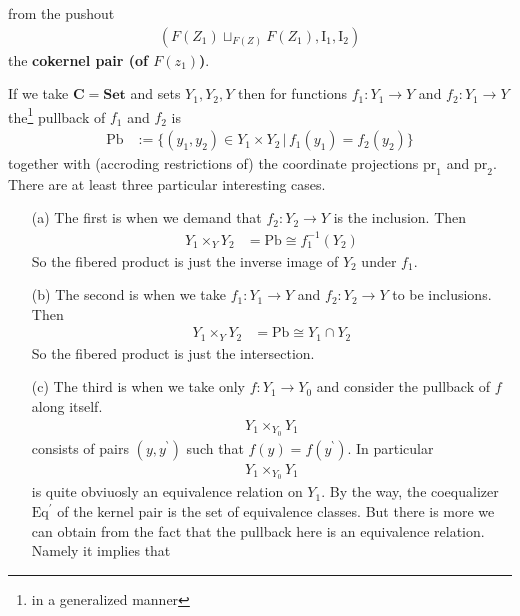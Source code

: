 \begin{exa}
\begin{enumerate}
\begin{enumerate}
from the pushout
\begin{align*}
  \left(
    F(Z_{1})
    \sqcup_{F(Z)}
    F(Z_{1}),
    \mathrm{I}_{1},
    \mathrm{I}_{2}
  \right)
\end{align*}
the \textbf{cokernel pair (of $F(z_{1})$)}.
\end{enumerate}
If we take $\mathbf{C} = \mathbf{Set}$ and sets $Y_{1},Y_{2},Y$ then for functions $f_{1} \colon Y_{1} \rightarrow Y$ and $f_{2} \colon Y_{1} \rightarrow Y$ the\footnote{in a generalized manner} pullback of $f_{1}$ and $f_{2}$ is
\begin{align*}
  \mathrm{Pb}
  &:=
  \lbrace
      (y_{1},y_{2})
      \in
      Y_{1}
      \times
      Y_{2}
    \,
    \vert
    \,
      f_{1}(y_{1})
      =
      f_{2}(y_{2})
  \rbrace
\end{align*}
together with (accroding restrictions of) the coordinate projections $\mathrm{pr}_{1}$ and $\mathrm{pr}_{2}$. There are at least three particular interesting cases.
\begin{enumerate}
\item[(a)]
The first is when we demand that $f_{2} \colon Y_{2} \rightarrow Y$ is the inclusion. Then
\begin{align*}
  Y_{1}
  \times_{Y}
  Y_{2}
  &=
  \mathrm{Pb}
  \cong
  f_{1}^{-1}(Y_{2})
\end{align*}
So the fibered product is just the inverse image of $Y_{2}$ under $f_{1}$.
\item[(b)]
The second is when we take $f_{1} \colon Y_{1} \rightarrow Y$ and $f_{2} \colon Y_{2} \rightarrow Y$ to be inclusions. Then
\begin{align*}
  Y_{1}
  \times_{Y}
  Y_{2}
  &=
  \mathrm{Pb}
  \cong
  Y_{1}
  \cap
  Y_{2}
\end{align*}
So the fibered product is just the intersection.
\item[(c)]
The third is when we take only $f \colon Y_{1} \rightarrow Y_{0}$ and consider the pullback of $f$ along itself.
\begin{align*}
  Y_{1}
  \times_{Y_{0}}
  Y_{1}
\end{align*}
consists of pairs $(y,y^{\backprime})$ such that $f(y) = f(y^{\backprime})$. In particular
\begin{align*}
  Y_{1}
  \times_{Y_{0}}
  Y_{1}
\end{align*}
is quite obviuosly an equivalence relation on $Y_{1}$. By the way, the coequalizer $\mathrm{Eq}^{\prime}$ of the kernel pair is the set of equivalence classes. But there is more we can obtain from the fact that the pullback here is an equivalence relation. Namely it implies that

\end{enumerate}
\end{enumerate}
\end{exa}
